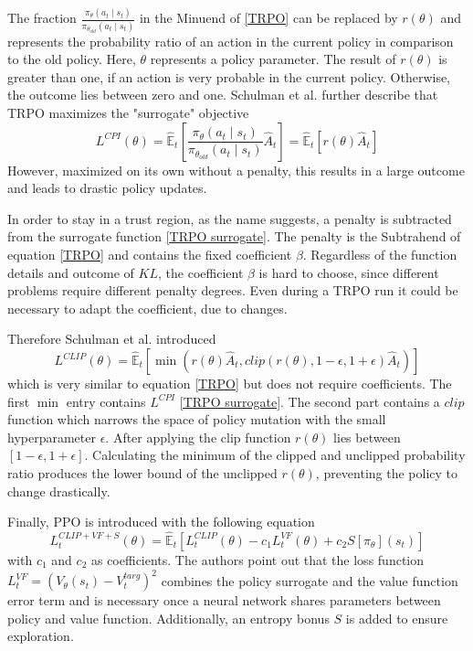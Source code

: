 The fraction $\frac{\pi_{\theta}(a_{t} \mid s_{t})}{\pi_{\theta_{old}}(a_{t} \mid s_{t})}$ in the Minuend of \eqref{TRPO} can be replaced by $r(\theta)$
and represents the probability ratio of an action in the current policy in comparison to the old policy. Here,  $\theta$ represents a policy parameter. The result of $r(\theta)$ is greater than one, if an action is very probable in the current policy. Otherwise, the outcome lies between zero and one. Schulman et al. further describe that TRPO maximizes the "surrogate" objective
\begin{equation}\label{TRPO surrogate}
    L^{CPI}(\theta) = \hat{\mathbb{E}}_{t} \left[ \frac{\pi_{\theta}(a_{t} \mid s_{t})}{\pi_{\theta_{old}}(a_{t} \mid s_{t})} \hat{A}_{t} \right]
    = \hat{\mathbb{E}}_{t} \left[ r(\theta)\hat{A}_{t} \right]
\end{equation}
However, maximized on its own without a penalty, this results in a large outcome and leads to drastic policy updates.

In order to stay in a trust region, as the name suggests, a penalty is subtracted from the surrogate function \eqref{TRPO surrogate}. The penalty is the Subtrahend of equation \eqref{TRPO} and contains the fixed coefficient $\beta$. Regardless of the function details and outcome of $KL$, the coefficient $\beta$ is hard to choose, since different problems require different penalty degrees. Even during a TRPO run it could be necessary to adapt the coefficient, due to changes.

Therefore Schulman et al. introduced
\begin{equation}\label{PPO}
    L^{CLIP}(\theta) = \hat{\mathbb{E}}_{t} \left[ \min \left( r(\theta)\hat{A}_{t},clip(r(\theta), 1-\epsilon, 1+\epsilon)\hat{A}_{t} \right) \right]
\end{equation}
which is very similar to equation \eqref{TRPO} but does not require coefficients. The first $\min$ entry contains $L^{CPI}$ \eqref{TRPO surrogate}. The second part contains a $clip$ function which narrows the space of policy mutation with the small hyperparameter $\epsilon$. After applying the clip function $r(\theta)$ lies between $[1-\epsilon,1+\epsilon]$. Calculating the minimum of the clipped and unclipped probability ratio produces the lower bound of the unclipped $r(\theta)$, preventing the policy to change drastically.

Finally, PPO is introduced with the following equation
\begin{equation}\label{PPO Algorithm}
    L_{t}^{CLIP+VF+S}(\theta) = \hat{\mathbb{E}}_{t} \left[ L_{t}^{CLIP}(\theta) - c_{1}L_{t}^{VF}(\theta) + c_{2}S[\pi_{\theta}](s_{t}) \right]
\end{equation}
with $c_{1}$ and $c_{2}$ as coefficients. The authors point out that the loss function \\
$L_{t}^{VF} = (V_{\theta}(s_{t})-V_{t}^{targ})^2$ combines the policy surrogate and the value function error term and is necessary once a neural network shares parameters between policy and value function. Additionally, an entropy bonus $S$ is added to ensure exploration.

